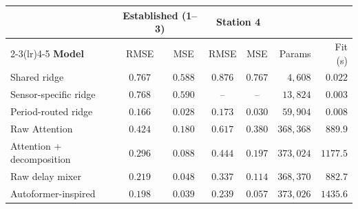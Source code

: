 \begin{tabular}{l cc cc rr}
\toprule
& \multicolumn{2}{c}{\textbf{Established (1--3)}} & \multicolumn{2}{c}{\textbf{Station 4}} & & \\
\cmidrule(lr){2-3}\cmidrule(lr){4-5}
\textbf{Model} & RMSE & MSE & RMSE & MSE & Params & Fit (s) \\
\midrule
Shared ridge & $0.767$ & $0.588$ & $0.876$ & $0.767$ & $4{,}608$ & $0.022$ \\
Sensor-specific ridge & $0.768$ & $0.590$ & -- & -- & $13{,}824$ & $0.003$ \\
Period-routed ridge & $0.166$ & $0.028$ & $0.173$ & $0.030$ & $59{,}904$ & $0.008$ \\
\midrule
Raw Attention & $0.424$ & $0.180$ & $0.617$ & $0.380$ & $368{,}368$ & $889.9$ \\
Attention + decomposition & $0.296$ & $0.088$ & $0.444$ & $0.197$ & $373{,}024$ & $1177.5$ \\
Raw delay mixer & $0.219$ & $0.048$ & $0.337$ & $0.114$ & $368{,}370$ & $882.7$ \\
Autoformer-inspired & $0.198$ & $0.039$ & $0.239$ & $0.057$ & $373{,}026$ & $1435.6$ \\
\bottomrule
\end{tabular}
